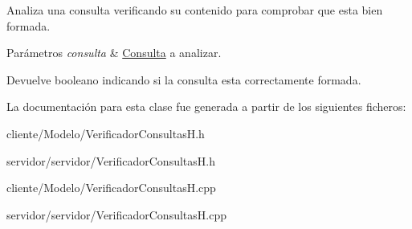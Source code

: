 \-Analiza una consulta verificando su contenido para comprobar que esta bien formada. 


\begin{DoxyParams}{\-Parámetros}
{\em consulta} & \hyperlink{classConsulta}{\-Consulta} a analizar. \\
\hline
\end{DoxyParams}
\begin{DoxyReturn}{\-Devuelve}
booleano indicando si la consulta esta correctamente formada. 
\end{DoxyReturn}


\-La documentación para esta clase fue generada a partir de los siguientes ficheros\-:\begin{DoxyCompactItemize}
\item 
cliente/\-Modelo/\-Verificador\-Consultas\-H.\-h\item 
servidor/servidor/\-Verificador\-Consultas\-H.\-h\item 
cliente/\-Modelo/\-Verificador\-Consultas\-H.\-cpp\item 
servidor/servidor/\-Verificador\-Consultas\-H.\-cpp\end{DoxyCompactItemize}
